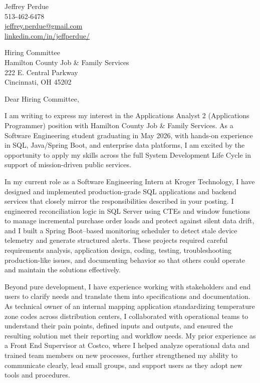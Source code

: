 \documentclass[letterpaper,11pt]{article}
\begin{document}
\begin{flushright}
Jeffrey Perdue\\
513-462-6478\\
\href{mailto:jeffrey.perdue@gmail.com}{jeffrey.perdue@gmail.com}\\
\href{https://linkedin.com/in/jeffperdue/}{linkedin.com/in/jeffperdue/}
\end{flushright}

\vspace{10pt}

Hiring Committee\\
Hamilton County Job \& Family Services\\
222 E. Central Parkway\\
Cincinnati, OH 45202

\vspace{10pt}

Dear Hiring Committee,

I am writing to express my interest in the Applications Analyst 2 (Applications Programmer) position with Hamilton County Job \& Family Services. As a Software Engineering student graduating in May 2026, with hands-on experience in SQL, Java/Spring Boot, and enterprise data platforms, I am excited by the opportunity to apply my skills across the full System Development Life Cycle in support of mission-driven public services.

In my current role as a Software Engineering Intern at Kroger Technology, I have designed and implemented production-grade SQL applications and backend services that closely mirror the responsibilities described in your posting. I engineered reconciliation logic in SQL Server using CTEs and window functions to manage incremental purchase order loads and protect against silent data drift, and I built a Spring Boot--based monitoring scheduler to detect stale device telemetry and generate structured alerts. These projects required careful requirements analysis, application design, coding, testing, troubleshooting production-like issues, and documenting behavior so that others could operate and maintain the solutions effectively.

Beyond pure development, I have experience working with stakeholders and end users to clarify needs and translate them into specifications and documentation. As technical owner of an internal mapping application standardizing temperature zone codes across distribution centers, I collaborated with operational teams to understand their pain points, defined inputs and outputs, and ensured the resulting solution met their reporting and workflow needs. My prior experience as a Front End Supervisor at Costco, where I helped analyze operational data and trained team members on new processes, further strengthened my ability to communicate clearly, lead small groups, and support users as they adopt new tools and procedures.
\end{document}
